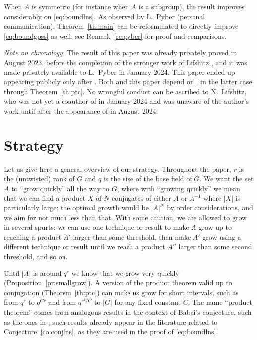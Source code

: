 \documentclass[a4paper]{article}
\theoremstyle{definition}
\numberwithin{equation}{section}
\begin{document}
When $A$ is symmetric (for instance when $A$ is a subgroup), the result improves considerably on \eqref{eq:boundlns}. As observed by L.~Pyber (personal communication), Theorem~\ref{th:main} can be reformulated to directly improve \eqref{eq:boundgpss} as well: see Remark~\ref{re:pyber} for proof and comparisons.
\medskip

\textit{Note on chronology.} The result of this paper was already privately proved in August 2023, before the completion of the stronger work of Lifshitz \cite{Lif24}, and it was made privately available to L.~Pyber in January 2024. This paper ended up appearing publicly only after \cite{Lif24}. Both \cite{Lif24} and this paper depend on \cite{GLPS24}, in the latter case through Theorem~\ref{th:ptc}. No wrongful conduct can be ascribed to N.~Lifshitz, who was not yet a coauthor of \cite{GLPS24} in January 2024 and was unaware of the author's work until after the appearance of \cite{Lif24} in August 2024.

\section{Strategy}

Let us give here a general overview of our strategy. Throughout the paper, $r$ is the (untwisted) rank of $G$ and $q$ is the size of the base field of $G$. We want the set $A$ to ``grow quickly'' all the way to $G$, where with ``growing quickly'' we mean that we can find a product $X$ of $N$ conjugates of either $A$ or $A^{-1}$ where $|X|$ is particularly large; the optimal growth would be $|A|^{N}$ by order considerations, and we aim for not much less than that. With some caution, we are allowed to grow in several spurts: we can use one technique or result to make $A$ grow up to reaching a product $A'$ larger than some threshold, then make $A'$ grow using a different technique or result until we reach a product $A''$ larger than some second threshold, and so on.

Until $|A|$ is around $q^{r}$ we know that we grow very quickly (Proposition~\ref{pr:smallgrow}). A version of the product theorem valid up to conjugation (Theorem~\ref{th:ptc}) can make us grow for short intervals, such as from $q^{r}$ to $q^{Cr}$ and from $q^{r^{2}/C}$ to $|G|$ for any fixed constant $C$. The name ``product theorem'' comes from analogous results in the context of Babai's conjecture, such as the ones in \cite{Hel08} \cite{BGT11} \cite{PS16} \cite{BDH21}; such results already appear in the literature related to Conjecture~\ref{co:conjlns}, as they are used in the proof of \eqref{eq:boundlns}.
\end{document}
